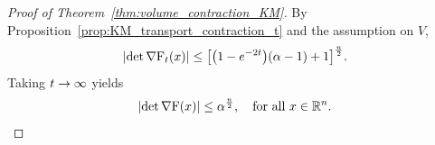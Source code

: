 \documentclass[AHL,Unicode,longabstracts]{cedram}
\newcommand{\R}{\mathbb R}
\newcommand{\KM}{\mathrm F}
\newcommand{\V}{V}
\newcommand{\dd}{n}
\newcommand{\lsh}{\alpha}
\renewcommand*{\to}{\mathchoice{\longrightarrow}{\rightarrow}{\rightarrow}{\rightarrow}}
\let\originalleft\left
\let\originalright\right
\renewcommand{\left}{\mathopen{}\mathclose\bgroup\originalleft}
\renewcommand{\right}{\aftergroup\egroup\originalright}
\let\oldin\in
\renewcommand{\in}{\mathchoice{\oldin}{\oldin}{\,\oldin\,}{\,\oldin\,}}
\begin{document}
\begin{proof}[Proof of Theorem~\ref{thm:volume_contraction_KM}]
By Proposition~\ref{prop:KM_transport_contraction_t} and the assumption on $\V$,
\begin{equation}\label{eq:det_Ft_est}
\lvert\det\nabla\KM_t(x)|\le\left[\left(1-e^{-2t}\right)(\lsh-1)+1\right]^{\frac{\dd}{2}}.
\end{equation}
Taking $t\to\infty$ yields
\[
\lvert\det\nabla\KM(x)|\le\lsh^{\frac{\dd}{2}}, \quad \text{for all }x\in \R^{\dd}.\qedhere
\]
\end{proof}


\appendix
\section{}\label{sec:appendix}
\end{document}
